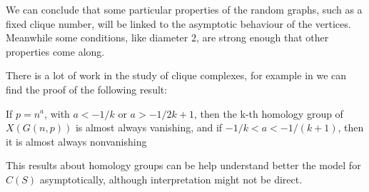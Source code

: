 We can conclude that some particular properties of the random graphs, such as a fixed clique number, will be linked to the asymptotic behaviour of the vertices. Meanwhile some conditions, like diameter 2, are strong enough that other properties come along.

There is a lot of work in the study of clique complexes, for example in \cite[Khale,09]{kahle2009topology} we can find the proof of the following result:
\begin{theorem}
If $p=n^{a}$, with $a < -1/k$ or
$a > -1/2k+1$, then the k-th homology group of $X(G(n, p))$ is almost always vanishing, and if $-1/k < a < -1/(k + 1)$, then it is almost always nonvanishing
\end{theorem}

This results about homology groups can be help understand better the model for $C(S)$ asymptotically, although interpretation might not be direct.